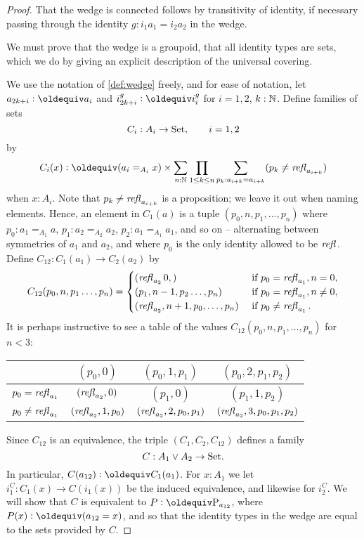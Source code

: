 \begin{proof}
That the wedge is connected follows by transitivity of identity, if necessary passing through the identity $g:i_1a_1=i_2a_2$ in the wedge.

We must prove that the wedge is a groupoid, \ie that all identity types are sets, which we do by giving an explicit description of the universal covering. 

 We use the notation of \cref{def:wedge} freely, and for ease of notation, let $a_{2k+i}\defequi a_i$ and $i_{2k+i}^g\defequi i_i^g$ for $i=1,2$, $k:\mathbb{N}$.  %
Define families of sets
$$C_i:A_i\to\mathord{\mathrm{Set}},\qquad i=1,2$$
by 
$$C_i(x)\defequi(a_i=_{A_i}x)\times\sum_{n:\NN}\prod_{1\leq k\leq n}\sum_{p_k:a_{i+k}=%
  a_{i+k}}(p_k\neq\refl {a_{i+k}})$$
when $x:A_i$.  Note that $p_k\neq\mathop{{\it refl}_{a_{i+k}}}$  is a proposition; we leave it out when naming elements. Hence, an element in $C_1(a)$ is a tuple
$(p_0,n,p_1,\dots,p_n)$ where $p_0:a_1=_{A_1}a$, $p_1:a_2=_{A_2}a_2$, $p_2:a_1=_{A_1}a_1$, and so on -- alternating between symmetries of $a_1$ and $a_2$, and where $p_0$ is the only identity allowed to be $\mathop{{\it refl}_{}}$. Define $C_{12}:C_1(a_1)\to C_2(a_2)$ by
$$C_{12}(p_0,n,p_1\dots,p_n)=
\begin{cases}
  (\mathop{{\it refl}_{a_2}}0,)&\text{ if }p_0=\mathop{{\it refl}_{a_1}}, n=0,\\
  (p_1,n-1,p_2\dots,p_n)& \text{ if }p_0=\mathop{{\it refl}_{a_1}},n\neq0,\\
  (\mathop{{\it refl}_{a_2}},n+1,p_0,\dots,p_n)& \text{ if }p_0\neq\mathop{{\it refl}_{a_1}}.
\end{cases}
$$
It is perhaps instructive to see a table of the values $C_{12}(p_0,n,p_1,\dots,p_n)$ for $n<3$:
\begin{center}
  \begin{tabular}{r|c cc}
    &$(p_0,0)$&$(p_0,1,p_1)$&$(p_0,2,p_1,p_2)$\\
    \hline
    $p_0=\mathop{{\it refl}_{a_1}}$&$(\mathop{{\it refl}_{a_2}},0)$&$(p_1,0)$&$(p_1,1,p_2)$\\
    $p_0\neq\mathop{{\it refl}_{a_1}}$&$(\mathop{{\it refl}_{a_2}},1,p_0)$&$(\mathop{{\it refl}_{a_2}},2,p_0,p_1)$&$(\mathop{{\it refl}_{a_2}},3,p_0,p_1,p_2)$
  \end{tabular}
\end{center}
Since $C_{12}$ is an equivalence, the triple $(C_1,C_2,C_{12})$ defines a family
$$C:A_1\vee A_2\to\mathord{\mathrm{Set}}.$$
In particular, $C(a_{12})\defequi C_1(a_1)$.
For $x:A_1$ we let $i^C_1:C_1(x)\to C(i_1(x))$ be the induced equivalence, and likewise for $i^C_2$.
We will show that $C$ is equivalent to $P\defequi \pathsp{a_{12}}$, where $P(x)\defequi(a_{12}=x)$, and so that the identity types in the wedge are equal to the sets provided by $C$.


\end{proof}

